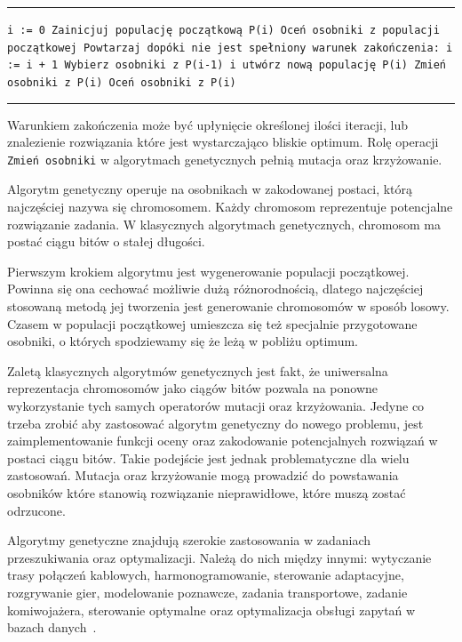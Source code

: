 \documentclass{xmgr}
\begin{document}
\noindent
\rule{360pt}{0.5pt}\newline
\texttt{i := 0\newline
Zainicjuj populację początkową P(i)\newline
Oceń osobniki z populacji początkowej\newline
Powtarzaj dopóki nie jest spełniony warunek zakończenia:\newline
\indent i := i + 1\newline
\indent Wybierz osobniki z P(i-1) i utwórz nową populację P(i)\newline
\indent Zmień osobniki z P(i)\newline
\indent Oceń osobniki z P(i)\newline
}
\rule{360pt}{0.5pt}

Warunkiem zakończenia może być upłynięcie określonej ilości iteracji, lub znalezienie rozwiązania które jest wystarczająco bliskie optimum. Rolę operacji \texttt{Zmień osobniki} w algorytmach genetycznych pełnią mutacja oraz krzyżowanie.

Algorytm genetyczny operuje na osobnikach w zakodowanej postaci, którą najczęściej nazywa się chromosomem. Każdy chromosom reprezentuje potencjalne rozwiązanie zadania. W klasycznych algorytmach genetycznych, chromosom ma postać ciągu bitów o stałej długości.

Pierwszym krokiem algorytmu jest wygenerowanie populacji początkowej. Powinna się ona cechować możliwie dużą różnorodnością, dlatego najczęściej stosowaną metodą jej tworzenia jest generowanie chromosomów w sposób losowy. Czasem w populacji początkowej umieszcza się też specjalnie przygotowane osobniki, o których spodziewamy się że leżą w pobliżu optimum.

Zaletą klasycznych algorytmów genetycznych jest fakt, że uniwersalna reprezentacja chromosomów jako ciągów bitów pozwala na ponowne wykorzystanie tych samych operatorów mutacji oraz krzyżowania. Jedyne co trzeba zrobić aby zastosować algorytm genetyczny do nowego problemu, jest zaimplementowanie funkcji oceny oraz zakodowanie potencjalnych rozwiązań w postaci ciągu bitów. Takie podejście jest jednak problematyczne dla wielu zastosowań. Mutacja oraz krzyżowanie mogą prowadzić do powstawania osobników które stanowią rozwiązanie nieprawidłowe, które muszą zostać odrzucone.

Algorytmy genetyczne znajdują szerokie zastosowania w zadaniach przeszukiwania oraz optymalizacji. Należą do nich między innymi: wytyczanie trasy połączeń kablowych, harmonogramowanie, sterowanie adaptacyjne, rozgrywanie gier, modelowanie poznawcze, zadania transportowe, zadanie komiwojażera, sterowanie optymalne oraz optymalizacja obsługi zapytań w bazach danych~\cite{Michalewicz:2003:AGSDPE}.
\end{document}
